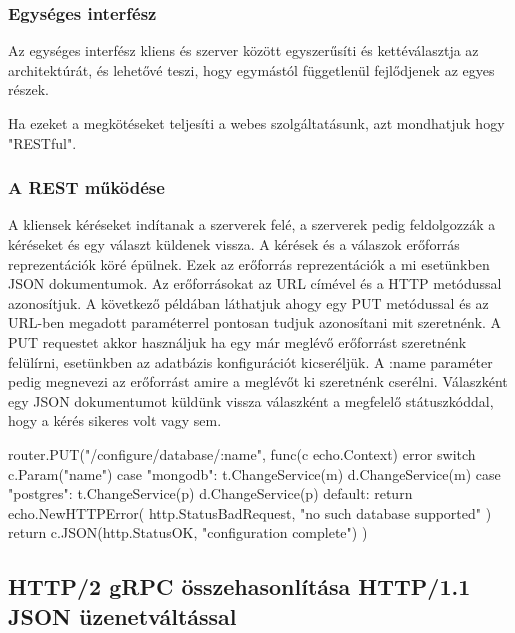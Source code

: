 \subsubsection{Egységes interfész}
Az egységes interfész kliens és szerver között egyszerűsíti és kettéválasztja az architektúrát, és lehetővé teszi, hogy egymástól függetlenül fejlődjenek az egyes részek.


Ha ezeket a megkötéseket teljesíti a webes szolgáltatásunk, azt mondhatjuk hogy "RESTful".


\subsubsection{A REST működése}
A kliensek kéréseket indítanak a szerverek felé, a szerverek pedig feldolgozzák a kéréseket és egy választ küldenek vissza.
A kérések és a válaszok erőforrás reprezentációk köré épülnek.
Ezek az erőforrás reprezentációk a mi esetünkben JSON dokumentumok.
Az erőforrásokat az URL címével és a HTTP metódussal azonosítjuk.
A következő példában láthatjuk ahogy egy PUT metódussal és az URL-ben megadott paraméterrel pontosan tudjuk azonosítani mit szeretnénk.
A PUT requestet akkor használjuk ha egy már meglévő erőforrást szeretnénk felülírni, esetünkben az adatbázis konfigurációt kicseréljük.
A :name paraméter pedig megnevezi az erőforrást amire a meglévőt ki szeretnénk cserélni.
Válaszként egy JSON dokumentumot küldünk vissza válaszként a megfelelő státuszkóddal, hogy a kérés sikeres volt vagy sem.

\begin{python}
    router.PUT("/configure/database/:name", func(c echo.Context) error {
        switch c.Param("name") {
            case "mongodb":
            t.ChangeService(m)
            d.ChangeService(m)
            case "postgres":
            t.ChangeService(p)
            d.ChangeService(p)
            default:
            return echo.NewHTTPError(
            http.StatusBadRequest,
            "no such database supported"
            )
        }
        return c.JSON(http.StatusOK, "configuration complete")
    })
\end{python}


\subsection{HTTP/2 gRPC összehasonlítása HTTP/1.1 JSON üzenetváltással}

